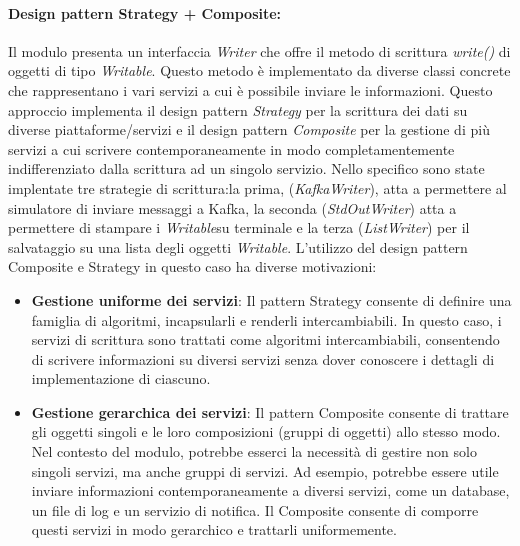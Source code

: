 \paragraph{Design pattern Strategy + Composite:}
Il modulo presenta un interfaccia \textit{Writer} che offre il metodo di scrittura \textit{write()} di oggetti di tipo \textit{Writable}.
Questo metodo è implementato da diverse classi concrete che rappresentano i vari servizi a cui è possibile inviare le informazioni.
Questo approccio implementa il design pattern \textit{Strategy} per la scrittura dei dati su diverse piattaforme/servizi e il design pattern \textit{Composite} per la gestione di più servizi a cui scrivere contemporaneamente in modo completamentemente indifferenziato dalla scrittura ad un singolo servizio.
Nello specifico sono state implentate tre strategie di scrittura:la prima, (\textit{KafkaWriter}), atta a permettere al simulatore di inviare messaggi a Kafka,  la seconda (\textit{StdOutWriter}) atta a permettere di stampare i \textit{Writable}su terminale e la terza (\textit{ListWriter}) per il salvataggio su una lista degli oggetti \textit{Writable}.
L'utilizzo del design pattern Composite e Strategy in questo caso ha diverse motivazioni:
\begin{itemize}
    \item \textbf{Gestione uniforme dei servizi}: Il pattern Strategy consente di definire una famiglia di algoritmi, incapsularli e renderli intercambiabili. In questo caso, i servizi di scrittura sono trattati come algoritmi intercambiabili, consentendo di scrivere informazioni su diversi servizi senza dover conoscere i dettagli di implementazione di ciascuno.
    \item \textbf{Gestione gerarchica dei servizi}: Il pattern Composite consente di trattare gli oggetti singoli e le loro composizioni (gruppi di oggetti) allo stesso modo. Nel contesto del modulo, potrebbe esserci la necessità di gestire non solo singoli servizi, ma anche gruppi di servizi. Ad esempio, potrebbe essere utile inviare informazioni contemporaneamente a diversi servizi, come un database, un file di log e un servizio di notifica. Il Composite consente di comporre questi servizi in modo gerarchico e trattarli uniformemente.
\end{itemize}

